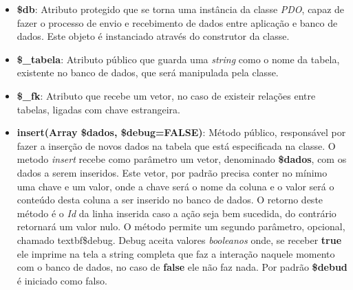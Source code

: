             \begin{itemize}
                \item\textbf{\$db}: Atributo protegido que se torna uma instância da classe \emph{PDO}, capaz de fazer o processo de envio e recebimento de dados entre aplicação e banco de dados. Este objeto é instanciado através do construtor da classe.

                \item\textbf{\$\_tabela}: Atributo público que guarda uma \emph{string} como o nome da tabela, existente no banco de dados, que será manipulada pela classe.

                \item\textbf{\$\_fk}: Atributo que recebe um vetor, no caso de existeir relações entre tabelas, ligadas com chave estrangeira.

                \item\textbf{insert(Array \$dados, \$debug=FALSE)}: Método público, responsável por fazer a inserção de novos dados na tabela que está especificada na classe. O metodo \emph{insert} recebe como parâmetro um vetor, denominado \textbf{\$dados}, com os dados a serem inseridos. Este vetor, por padrão precisa conter no mínimo uma chave e um valor, onde a chave será o nome da coluna e o valor será o conteúdo desta coluna a ser inserido no banco de dados. O retorno deste método é o \emph{Id} da linha inserida caso a ação seja bem sucedida, do contrário retornará um valor nulo. O método permite um segundo parâmetro, opcional, chamado textbf{\$debug}. Debug aceita valores \emph{booleanos} onde, se receber \textbf{true} ele imprime na tela a string completa que faz a interação naquele momento com o banco de dados, no caso de \textbf{false} ele não faz nada. Por padrão \textbf{\$debud} é iniciado como falso.


\end{itemize}
